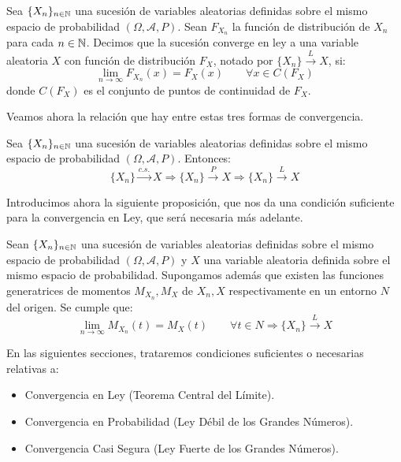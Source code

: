 \begin{definicion}
    Sea $\{X_n\}_{n\in \mathbb{N}}$ una sucesión de variables aleatorias definidas sobre el mismo espacio de probabilidad $(\Omega, \mathcal{A}, P)$. Sean $F_{X_n}$ la función de distribución de $X_n$ para cada $n\in \mathbb{N}$. Decimos que la sucesión converge en ley a una variable aleatoria $X$ con función de distribución $F_X$, notado por $\{X_n\} \xrightarrow{L} X$, si:
    \begin{equation*}
        \lim_{n\to \infty} F_{X_n}(x) = F_X(x) \qquad \forall x\in C(F_X)
    \end{equation*}    
    donde $C(F_X)$ es el conjunto de puntos de continuidad de $F_X$.
\end{definicion}

Veamos ahora la relación que hay entre estas tres formas de convergencia.
\begin{prop}
    Sea $\{X_n\}_{n\in \mathbb{N}}$ una sucesión de variables aleatorias definidas sobre el mismo espacio de probabilidad $(\Omega, \mathcal{A}, P)$. Entonces:
    \begin{equation*}
        \{X_n\} \xrightarrow{c.s.} X \Longrightarrow \{X_n\} \xrightarrow{P} X \Longrightarrow \{X_n\} \xrightarrow{L} X
    \end{equation*}
\end{prop}

Introducimos ahora la siguiente proposición, que nos da una condición suficiente para la convergencia en Ley, que será necesaria más adelante.
\begin{prop}
    Sean $\{X_n\}_{n\in \mathbb{N}}$ una sucesión de variables aleatorias definidas sobre el mismo espacio de probabilidad $(\Omega, \mathcal{A}, P)$ y $X$ una variable aleatoria definida sobre el mismo espacio de probabilidad. Supongamos además que existen las funciones generatrices de momentos $M_{X_n}, M_X$ de $X_n, X$ respectivamente en un entorno $N$ del origen. Se cumple que:
    \begin{equation*}
        \lim_{n\to \infty} M_{X_n}(t) = M_X(t) \qquad \forall t\in N
        \Longrightarrow \{X_n\} \xrightarrow{L} X
    \end{equation*}
\end{prop}

En las siguientes secciones, trataremos condiciones suficientes o necesarias relativas a:
\begin{itemize}
    \item Convergencia en Ley (Teorema Central del Límite).
    \item Convergencia en Probabilidad (Ley Débil de los Grandes Números).
    \item Convergencia Casi Segura (Ley Fuerte de los Grandes Números).
\end{itemize}

